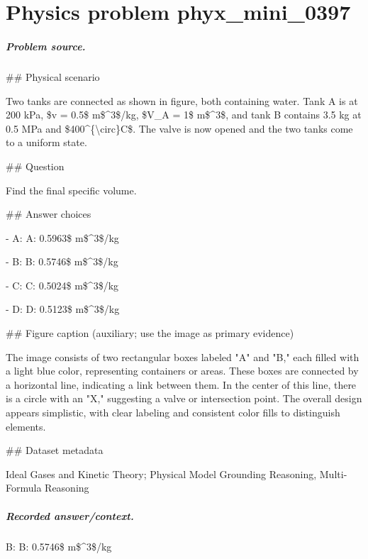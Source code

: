 
\chapter{Physics problem phyx\_mini\_0397}
\label{ch:PhyXMiniProblems_problem_phyx_mini_0397}

\paragraph{Problem source.}
\#\# Physical scenario

Two tanks are connected as shown in figure, both containing water. Tank A is at 200 kPa, \$v = 0.5\$ m\$\textasciicircum{}3\$/kg, \$V\_A = 1\$ m\$\textasciicircum{}3\$, and tank B contains 3.5 kg at 0.5 MPa and \$400\textasciicircum{}\{\textbackslash{}circ\}C\$. The valve is now opened and the two tanks come to a uniform state.

\#\# Question

Find the final specific volume.

\#\# Answer choices

- A: A: 0.5963\$ m\$\textasciicircum{}3\$/kg

- B: B: 0.5746\$ m\$\textasciicircum{}3\$/kg

- C: C: 0.5024\$ m\$\textasciicircum{}3\$/kg

- D: D: 0.5123\$ m\$\textasciicircum{}3\$/kg

\#\# Figure caption (auxiliary; use the image as primary evidence)

The image consists of two rectangular boxes labeled "A" and "B," each filled with a light blue color, representing containers or areas. These boxes are connected by a horizontal line, indicating a link between them. In the center of this line, there is a circle with an "X," suggesting a valve or intersection point. The overall design appears simplistic, with clear labeling and consistent color fills to distinguish elements.

\#\# Dataset metadata

Ideal Gases and Kinetic Theory; Physical Model Grounding Reasoning, Multi-Formula Reasoning

\paragraph{Recorded answer/context.}
B: B: 0.5746\$ m\$\textasciicircum{}3\$/kg

